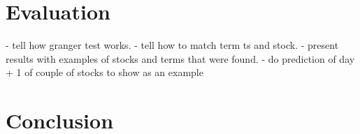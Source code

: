 \documentclass{article}
\begin{document}
\section{Evaluation}
- tell how granger test works.
- tell how to match term ts and stock.
- present results with examples of stocks and terms that were found.
- do prediction of day + 1 of couple of stocks to show as an example

\section{Conclusion}


\end{document}
